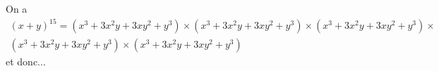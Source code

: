 \documentclass[10pt,a4paper]{article}
\begin{document}
On a
\begin{multline}
(x+y)^{15} = (x^3+3x^2y+3xy^2+y^3) \times (x^3+3x^2y+3xy^2+y^3) \times 
(x^3+3x^2y+3xy^2+y^3) \times \\
(x^3+3x^2y+3xy^2+y^3) \times (x^3+3x^2y+3xy^2+y^3)
\end{multline}
et donc...
\end{document}
